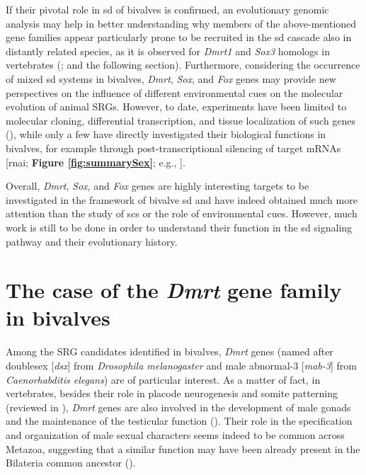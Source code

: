 \documentclass[../main.tex]{subfiles}
\begin{document}
If their pivotal role in \gls{sd} of bivalves is confirmed, an evolutionary genomic analysis may help in better understanding why members of the above-mentioned gene families appear particularly prone to be recruited in the \gls{sd} cascade also in distantly related species, as it is observed for \textit{Dmrt1} and \textit{Sox3} homologs in vertebrates (\textbf{\cite{marshall2010homologies,bachtrog2014sex}}; and the following section). Furthermore, considering the occurrence of mixed \gls{sd} systems in bivalves, \textit{Dmrt}, \textit{Sox}, and \textit{Fox} genes may provide new perspectives on the influence of different environmental cues on the molecular evolution of animal SRGs. However, to date, experiments have been limited to molecular cloning, differential transcription, and tissue localization of such genes (\textbf{\cite{liang2019sox2,sun2022examination}}), while only a few have directly investigated their biological functions in bivalves, for example through post-transcriptional silencing of target mRNAs [\gls{rnai}; \textbf{Figure \ref{fig:summarySex}}; e.g., \textbf{\cite{liang2019sox2,wang2020identification,sun2022examination}}].

Overall, \textit{Dmrt}, \textit{Sox}, and \textit{Fox} genes are highly interesting targets to be investigated in the framework of bivalve \gls{sd} and have indeed obtained much more attention than the study of \glspl{sc} or the role of environmental cues. However, much work is still to be done in order to understand their function in the \gls{sd} signaling pathway and their evolutionary history.

\section{The case of the \textit{Dmrt} gene family in bivalves}

Among the SRG candidates identified in bivalves, \textit{Dmrt} genes (named after doublesex [\textit{dsx}] from \textit{Drosophila melanogaster} and male abnormal-3 [\textit{mab-3}] from \textit{Caenorhabditis elegans}) are of particular interest. As a matter of fact, in vertebrates, besides their role in placode neurogenesis and somite patterning (reviewed in \textbf{\cite{mawaribuchi2019independent}}), \textit{Dmrt} genes are also involved in the development of male gonads and the maintenance of the testicular function (\textbf{\cite{sun2022examination}}). Their role in the specification and organization of male sexual characters seems indeed to be common across Metazoa, suggesting that a similar function may have been already present in the Bilateria common ancestor (\textbf{\cite{kopp2012dmrt, beukeboom2014evolution}}).
\end{document}
